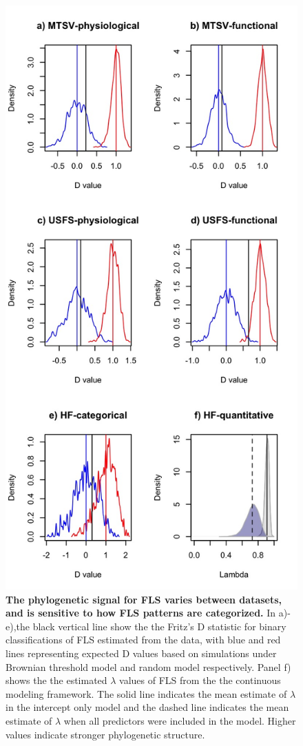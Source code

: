 \documentclass[12pt]{article}\usepackage[]{graphicx}\usepackage[]{color}
\begin{document}
\begin{figure}[H]
 \includegraphics[height=0.9\textheight]{..//phylosig.jpeg} 
  \caption{\textbf{The phylogenetic signal for FLS varies between datasets, and is sensitive to how FLS patterns are categorized.} In a)-e),the black vertical line show the the Fritz's D statistic for binary classifications of FLS estimated from the data, with blue and red lines representing expected D values based on simulations under Brownian threshold model and random model respectively. Panel f) shows the the estimated $\lambda$ values of FLS from the the continuous modeling framework. The solid line indicates the mean estimate of $\lambda$ in the intercept only model and the dashed line indicates the mean estimate of $\lambda$ when all predictors were included in the model. Higher values indicate stronger phylogenetic structure.}
    \label{fig:Dstat}
    \end{figure}
\end{document}
